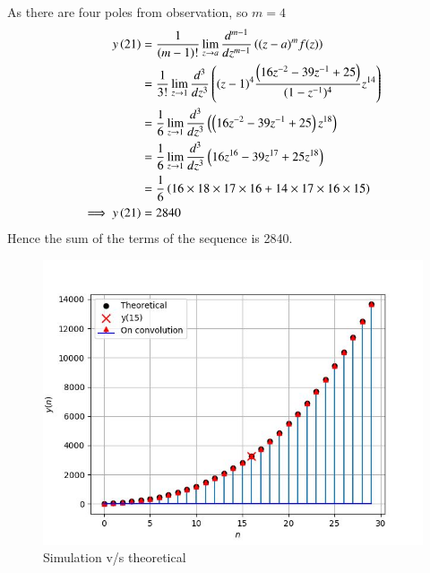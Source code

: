 \documentclass[journal,12pt,twocolumn]{IEEEtran}
\theoremstyle{remark}
\begin{document}
As there are four poles from observation, so $m=4$
\begin{align}
    y\left(21\right) &= \frac{1}{(m-1)!} \lim_{z \to a} \frac{d^{m-1}}{dz^{m-1}}\left((z-a)^mf(z)\right)\\
    &= \frac{1}{3!} \lim_{z \to 1} \frac{d^{3}}{dz^{3}}\left((z-1)^4 \frac{\left(16z^{-2}-39z^{-1}+25\right)}{(1-z^{-1})^4} z^{14}\right)\\
    &= \frac{1}{6} \lim_{z \to 1} \frac{d^{3}}{dz^{3}}\left(\left(16z^{-2}-39z^{-1}+25\right)z^{18}\right)\\
    &= \frac{1}{6} \lim_{z \to 1} \frac{d^{3}}{dz^{3}}\left(16z^{16}-39z^{17}+25z^{18}\right)\\
    &= \frac{1}{6}  \left(16 \times 18 \times 17 \times 16+14 \times 17 \times 16 \times 15 \right)\\
    \implies y\left(21\right)&=2840 
\end{align}
Hence the sum of the terms of the sequence is 2840.

\begin{figure}[h]
    \centering  

\includegraphics[width=\columnwidth]{fig/plot.png}

\begin{center}
    \caption{Simulation v/s theoretical}
\end{center}
    
    \label{fig:}
\end{figure}
\end{document}
